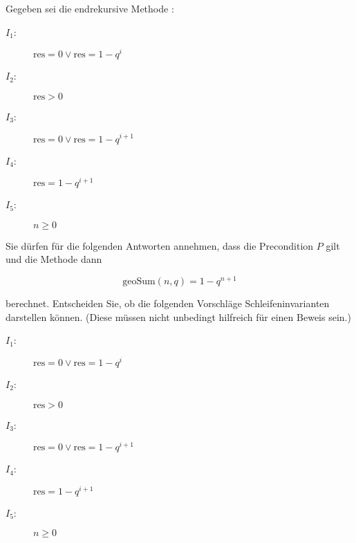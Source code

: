 \documentclass{bschlangaul-aufgabe}
\begin{document}

\let\wp=\bWpKalkuelOhneMathe

Gegeben sei die endrekursive Methode :


\begin{description}
\item[$I_1$:] $\text{res} = 0 \lor \text{res} = 1 - q^i$

\item[$I_2$:] $\text{res} > 0$

\item[$I_3$:] $\text{res} = 0 \lor \text{res} = 1 - q^{i+1}$

\item[$I_4$:] $\text{res} = 1 - q^{i+1}$

\item[$I_5$:] $n \geq 0$
\end{description}

\noindent
Sie dürfen für die folgenden Antworten annehmen, dass die Precondition
$P$ gilt und die Methode dann

\begin{displaymath}
\text{geoSum}(n, q) = 1 - q^{n+1}
\end{displaymath}

\noindent
berechnet. Entscheiden Sie, ob die folgenden Vorschläge
Schleifeninvarianten darstellen können. (Diese müssen nicht unbedingt
hilfreich für einen Beweis sein.)

\begin{description}
\item[$I_1$:] $\text{res} = 0 \lor \text{res} = 1 - q^i$

\item[$I_2$:] $\text{res} > 0$

\item[$I_3$:] $\text{res} = 0 \lor \text{res} = 1 - q^{i+1}$

\item[$I_4$:] $\text{res} = 1 - q^{i+1}$

\item[$I_5$:] $n \geq 0$
\end{description}
\end{document}
